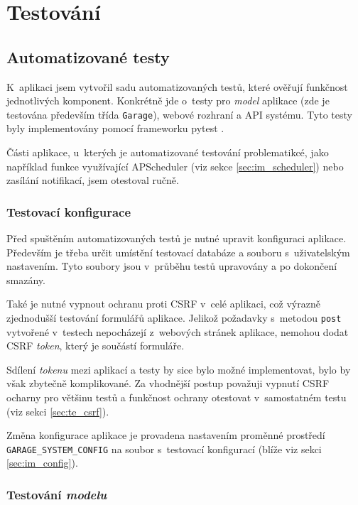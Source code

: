 \chapter{Testování}
\label{sec:te}

\section{Automatizované testy}

K~aplikaci jsem vytvořil sadu automatizovaných testů, které ověřují funkčnost jednotlivých komponent. Konkrétně jde o~testy pro \textit{model} aplikace (zde je testována především třída \texttt{Garage}), webové rozhraní a API systému. Tyto testy byly implementovány pomocí frameworku pytest \cite{pytest}.

Části aplikace, u~kterých je automatizované testování problematikcé, jako například funkce využívající APScheduler (viz sekce \ref{sec:im_scheduler}) nebo zasílání notifikací, jsem otestoval ručně.

\subsection{Testovací konfigurace}

Před spuštěním automatizovaných testů je nutné upravit konfiguraci aplikace. Především je třeba určit umístění testovací databáze a souboru s~uživatelským nastavením. Tyto soubory jsou v~průběhu testů upravovány a po dokončení smazány.

Také je nutné vypnout ochranu proti CSRF v~celé aplikaci, což výrazně zjednodušší testování formulářů aplikace. Jelikož požadavky s~metodou \texttt{post} vytvořené v~testech nepocházejí z~webových stránek aplikace, nemohou dodat CSRF \textit{token}, který je součástí formuláře. 

Sdílení \textit{tokenu} mezi aplikací a testy by sice bylo možné implementovat, bylo by však zbytečně komplikované. Za vhodnější postup považuji vypnutí CSRF ocharny pro většinu testů a funkčnost ochrany otestovat v~samostatném testu (viz sekci \ref{sec:te_csrf}).

Změna konfigurace aplikace je provadena nastavením proměnné prostředí \texttt{GARAGE\_SYSTEM\_CONFIG} na soubor s~testovací konfigurací (blíže viz sekci \ref{sec:im_config}).

\subsection{Testování \textit{modelu}}
\label{sec:te_model}

